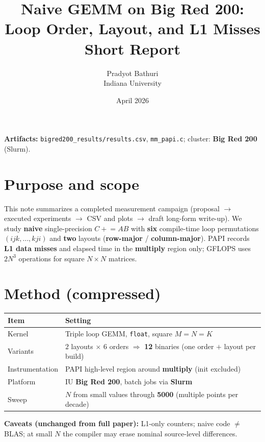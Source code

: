 \documentclass[11pt]{article}
\title{Naive GEMM on Big Red 200: Loop Order, Layout, and L1 Misses\\[0.5em]
\large Short Report}
\author{Pradyot Bathuri \\ Indiana University}
\date{April 2026}
\begin{document}
\maketitle

\noindent\textbf{Artifacts:} \texttt{bigred200\_results/results.csv}, \texttt{mm\_papi.c}; cluster: \textbf{Big Red 200} (Slurm).

\section*{Purpose and scope}

This note summarizes a completed measurement campaign (proposal $\rightarrow$ executed experiments $\rightarrow$ CSV and plots $\rightarrow$ draft long-form write-up). We study \textbf{naive} single-precision $C \mathrel{+}= AB$ with \textbf{six} compile-time loop permutations $(ijk,\ldots,kji)$ and \textbf{two} layouts (\textbf{row-major} / \textbf{column-major}). PAPI records \textbf{L1 data misses} and elapsed time in the \textbf{multiply} region only; GFLOPS uses $2N^3$ operations for square $N\times N$ matrices.

\section*{Method (compressed)}

\begin{table}[h]
\centering
\begin{tabular}{@{}ll@{}}
\toprule
\textbf{Item} & \textbf{Setting} \\
\midrule
Kernel & Triple loop GEMM, \texttt{float}, square $M=N=K$ \\
Variants & $2$ layouts $\times$ $6$ orders $\Rightarrow$ \textbf{12} binaries (one order $+$ layout per build) \\
Instrumentation & PAPI high-level region around \textbf{multiply} (init excluded) \\
Platform & IU \textbf{Big Red 200}, batch jobs via \textbf{Slurm} \\
Sweep & $N$ from small values through \textbf{5000} (multiple points per decade) \\
\bottomrule
\end{tabular}
\end{table}

\noindent\textbf{Caveats (unchanged from full paper):} L1-only counters; naive code $\neq$ BLAS; at small $N$ the compiler may erase nominal source-level differences.
\end{document}
